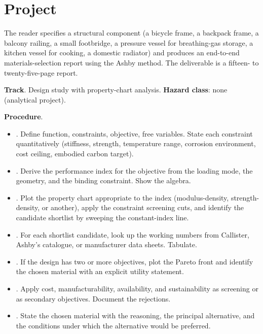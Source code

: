 \section{Project}

\begin{project}
The reader specifies a structural component (a bicycle frame, a
backpack frame, a balcony railing, a small footbridge, a pressure
vessel for breathing-gas storage, a kitchen vessel for cooking, a
domestic radiator) and produces an end-to-end materials-selection
report using the Ashby method. The deliverable is a fifteen- to
twenty-five-page report.

\textbf{Track}. Design study with property-chart analysis.
\textbf{Hazard class}: none (analytical project).

\textbf{Procedure}.

\begin{itemize}[leftmargin=*]
\item {}. Define function, constraints, objective,
  free variables. State each constraint quantitatively (stiffness,
  strength, temperature range, corrosion environment, cost ceiling,
  embodied carbon target).
\item {}. Derive the performance index for
  the objective from the loading mode, the geometry, and the binding
  constraint. Show the algebra.
\item {}. Plot the property chart appropriate
  to the index (modulus-density, strength-density, or another),
  apply the constraint screening cuts, and identify the candidate
  shortlist by sweeping the constant-index line.
\item {}. For each shortlist candidate, look up
  the working numbers from Callister, Ashby's catalogue, or
  manufacturer data sheets. Tabulate.
\item {}. If the design has two or more
  objectives, plot the Pareto front and identify the chosen material
  with an explicit utility statement.
\item {}. Apply cost, manufacturability,
  availability, and sustainability as screening or as secondary
  objectives. Document the rejections.
\item {}. State the chosen material with
  the reasoning, the principal alternative, and the conditions
  under which the alternative would be preferred.
\end{itemize}


\end{project}
